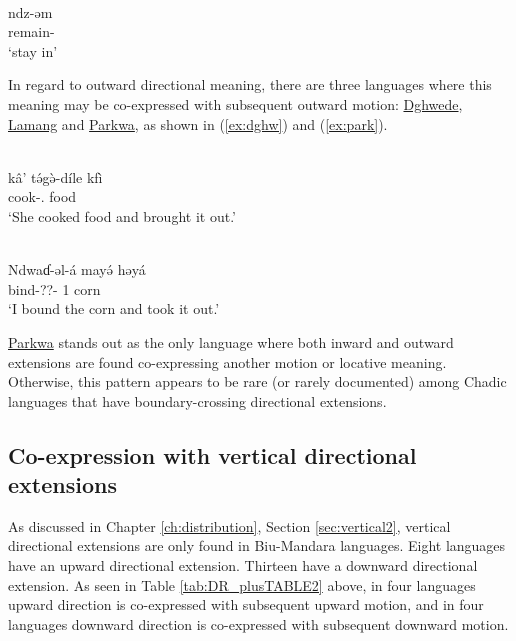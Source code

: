 \ea\label{ex:glav144}
 \\
\gll ndz-əm	\\ 
remain-	\\
\glt `stay in'
\z 

In regard to outward directional meaning, there are three languages where this meaning may be co-expressed with subsequent outward motion: \hyperref[dghw]{Dghwede}, \hyperref[lama]{Lamang} and \hyperref[park]{Parkwa}, as shown in (\ref{ex:dghw}) and (\ref{ex:park}).

\ea\label{ex:dghw}
 \\
\gll  kâ' tə́gə̀-díle kfì	\\
 cook-. food	\\
\glt `She cooked food and brought it out.'

\ex\label{ex:park}
 \\
\gll Ndwaɗ-əl-á mayə́ həyá	\\
bind-??- 1 corn		\\
\glt `I bound the corn and took it out.'
\z 

\hyperref[park]{Parkwa} stands out as the only language where both inward and outward extensions are found co-expressing another motion or locative meaning. Otherwise, this pattern appears to be rare (or rarely documented) among Chadic languages that have boundary-crossing directional extensions.

\subsection{Co-expression with vertical directional extensions} \label{sec:covert}

As discussed in Chapter \ref{ch:distribution}, Section \ref{sec:vertical2}, vertical directional extensions are only found in Biu-Mandara languages. Eight languages have an upward directional extension. Thirteen have a downward directional extension. As seen in Table \ref{tab:DR_plusTABLE2} above, in four languages upward direction is co-expressed with subsequent upward motion, and in four languages downward direction is co-expressed with subsequent downward motion. 

